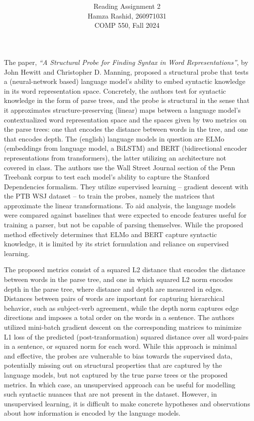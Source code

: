 \documentclass[11pt]{article}
\title{ }
\author{ Reading Assignment 2 \\ Hamza Rashid, 260971031 \\ COMP 550, Fall 2024}
\date{}
\begin{document}
\maketitle

\vspace{-5ex}

The paper, \textit{“A Structural Probe for Finding 
Syntax in Word Representations”}, by John Hewitt and Christopher D. Manning,
proposed a structural probe that tests a (neural-network based) 
language model's ability to embed syntactic knowledge 
in its word representation space. Concretely, the authors
test for syntactic knowledge in the form of parse trees, and
the probe is structural in the sense that it approximates
structure-preserving (linear) maps
between a language model's contextualized word representation space and 
the spaces given by two metrics on the parse trees: one that encodes the
distance between words in the tree, and one that encodes depth.
The (english) language models in question are ELMo (embeddings from language model, a BiLSTM)
and BERT (bidirectional encoder representations from transformers), 
the latter utilizing an architecture not covered in class. The authors use the Wall Street Journal section of the 
Penn Treebank corpus to test each model's ability to capture
the Stanford Dependencies formalism. 
They utilize supervised learning – gradient descent with the PTB WSJ dataset –
to train the probes, namely the matrices that 
approximate the linear transformations.
To aid analysis, the language models
were compared against baselines that were expected to 
encode features useful for training a parser, but not be capable of
parsing themselves. While the proposed method effectively determines
that ELMo and BERT capture syntactic knowledge, it is limited by its 
strict formulation and reliance on supervised learning.


The proposed metrics consist of a squared L2 distance that encodes the 
distance between words in the parse tree, and
one in which squared L2 norm encodes depth in the parse tree, 
where distance and depth are measured in edges. Distances between pairs of words
are important for capturing hierarchical behavior, such as subject-verb agreement,
while the depth norm captures edge directions and imposes a total order 
on the words in a sentence.
The authors utilized mini-batch gradient descent on the corresponding matrices to minimize 
L1 loss of the predicted (post-tranformation) squared distance over all word-pairs in a sentence, 
or squared norm for each word. While this approach is minimal and effective, the probes
are vulnerable to bias towards the supervised data, 
potentially missing out on structural properties that are
captured by the language models, but not captured by the true parse trees or the proposed metrics.
In which case, an unsupervised approach can be useful for modelling such syntactic nuances
that are not present in the dataset. However, in unsupervised learning,
it is difficult to make concrete hypotheses and observations about how
information is encoded by the language models. 
\end{document}
